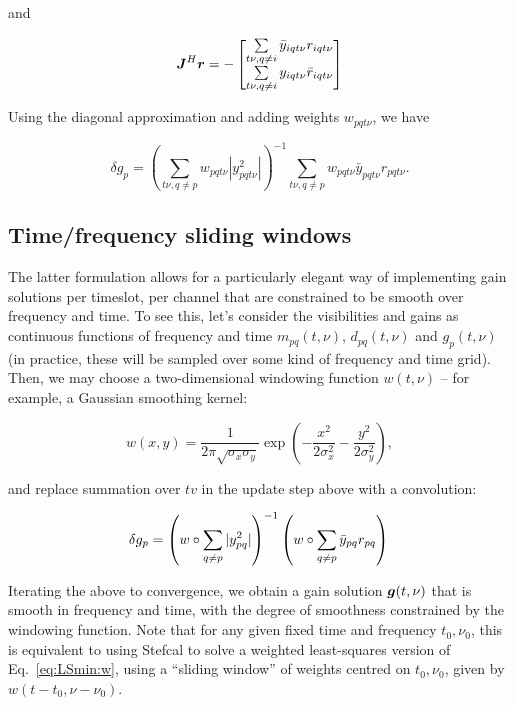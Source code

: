 \documentclass[useAMS,usenatbib]{mn2e}
\newcommand{\mat}[1]{{\bmath{#1}}}
\newcommand{\JJ}{\mat{J}} %
\begin{document}
and 

\begin{equation}
\label{eq:JHR:DI:tf}
\JJ^H\bmath{r} 
= -\Matrix{c}{
\sum\limits_{t\nu,q\ne i} \bar{y}_{iqt\nu} r_{iqt\nu}   \\
\sum\limits_{t\nu,q\ne i} y_{iqt\nu} \bar{r}_{iqt\nu}  
}
\end{equation}

Using the diagonal approximation and adding weights $w_{pqt\nu}$, we have


\begin{equation}
\label{eq:JHJ:diag:W:tf}
\delta g_p = \left( \sum\limits_{t\nu,q\ne p} w_{pqt\nu} |y^2_{pqt\nu}| \right )^{-1} \sum\limits_{t\nu,q\ne p} w_{pqt\nu} \bar{y}_{pqt\nu} r_{pqt\nu}.
\end{equation}


\subsection{Time/frequency sliding windows}
\label{sec:DI:smooth}

The latter formulation allows for a particularly elegant way of implementing gain solutions per timeslot, per channel
that are constrained to be smooth over frequency and time. To see this, let's consider the visibilities and gains as
continuous functions of frequency and time $m_{pq}(t,\nu)$, $d_{pq}(t,\nu)$ and $g_p(t,\nu)$ (in practice, these will be sampled over some kind of frequency and time grid). Then, we may choose a two-dimensional windowing function $w(t,\nu)$ -- for example, 
a Gaussian smoothing kernel:

\[
w(x,y) = \frac{1}{2\pi\sqrt{\sigma_x\sigma_y}} \exp\left( -\frac{x^2}{2\sigma^2_x} - \frac{y^2}{2\sigma_y^2} \right),
\]

and replace summation over $tv$ in the update step above with a convolution:

\begin{equation}
\label{eq:JHJ:diag:smooth}
\delta g_p = \left( w\circ\sum\limits_{q\ne p} |y^2_{pq}| \right )^{-1} \left( w\circ \sum\limits_{q\ne p} \bar{y}_{pq} r_{pq} \right )\\
\end{equation}

Iterating the above to convergence, we obtain a gain solution $\bmath{g}(t,\nu)$ that is smooth in frequency and time, with the degree of smoothness 
constrained by the windowing function. Note that for any given fixed time and frequency $t_0,\nu_0$, this is equivalent to using Stefcal to solve a weighted least-squares version of Eq.~\ref{eq:LSmin:w}, using a ``sliding window'' of weights centred on $t_0,\nu_0$, given by $w(t-t_0,\nu-\nu_0)$.
\end{document}
